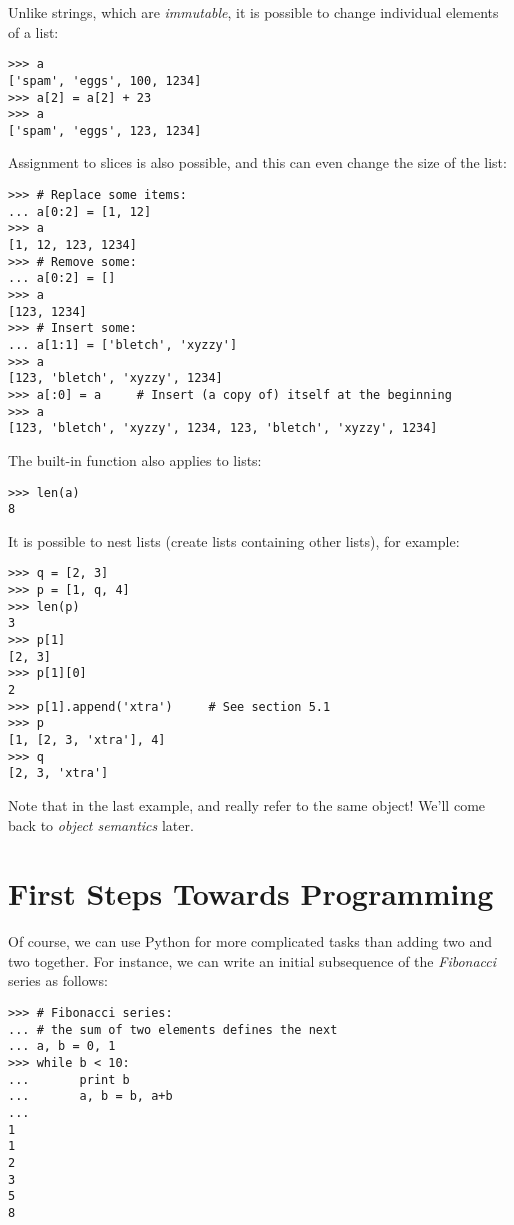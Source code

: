 \documentclass{manual}
\begin{document}
Unlike strings, which are \emph{immutable}, it is possible to change
individual elements of a list:

\begin{verbatim}
>>> a
['spam', 'eggs', 100, 1234]
>>> a[2] = a[2] + 23
>>> a
['spam', 'eggs', 123, 1234]
\end{verbatim}

Assignment to slices is also possible, and this can even change the size
of the list:

\begin{verbatim}
>>> # Replace some items:
... a[0:2] = [1, 12]
>>> a
[1, 12, 123, 1234]
>>> # Remove some:
... a[0:2] = []
>>> a
[123, 1234]
>>> # Insert some:
... a[1:1] = ['bletch', 'xyzzy']
>>> a
[123, 'bletch', 'xyzzy', 1234]
>>> a[:0] = a     # Insert (a copy of) itself at the beginning
>>> a
[123, 'bletch', 'xyzzy', 1234, 123, 'bletch', 'xyzzy', 1234]
\end{verbatim}

The built-in function  also applies to lists:

\begin{verbatim}
>>> len(a)
8
\end{verbatim}

It is possible to nest lists (create lists containing other lists),
for example:

\begin{verbatim}
>>> q = [2, 3]
>>> p = [1, q, 4]
>>> len(p)
3
>>> p[1]
[2, 3]
>>> p[1][0]
2
>>> p[1].append('xtra')     # See section 5.1
>>> p
[1, [2, 3, 'xtra'], 4]
>>> q
[2, 3, 'xtra']
\end{verbatim}

Note that in the last example,  and  really refer to
the same object!  We'll come back to \emph{object semantics} later.

\section{First Steps Towards Programming \label{firstSteps}}

Of course, we can use Python for more complicated tasks than adding
two and two together.  For instance, we can write an initial
subsequence of the \emph{Fibonacci} series as follows:

\begin{verbatim}
>>> # Fibonacci series:
... # the sum of two elements defines the next
... a, b = 0, 1
>>> while b < 10:
...       print b
...       a, b = b, a+b
... 
1
1
2
3
5
8
\end{verbatim}
\end{document}
